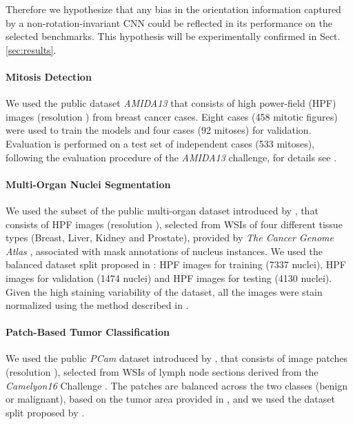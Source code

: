 \documentclass[twocolumn,final]{article}
\begin{document}
Therefore we hypothesize that any bias in the orientation information captured by a non-rotation-invariant CNN could be reflected in its performance on the selected benchmarks.
This hypothesis will be experimentally confirmed in Sect. \ref{sec:results}.

\paragraph{Mitosis Detection}
We used the public dataset \textit{AMIDA13} \citep{veta2015assessment} that consists of high power-field (HPF) images (resolution ) from  breast cancer cases.
Eight cases (458 mitotic figures) were used to train the models and four cases (92 mitoses) for validation.
Evaluation is performed on a test set of  independent cases (533 mitoses), following the evaluation procedure of the \textit{AMIDA13} challenge, for details see \citep{veta2015assessment}.

\paragraph{Multi-Organ Nuclei Segmentation}
We used the subset of the public multi-organ dataset introduced by \citep{kumar2017dataset}, that consists of  HPF images (resolution ), selected from WSIs of four different tissue types (Breast, Liver, Kidney and Prostate), provided by \textit{The Cancer Genome Atlas} \citep{tcga2012}, associated with mask annotations of nucleus instances.
We used the balanced dataset split proposed in \citep{lafarge2019domain}:  HPF images for training (7337 nuclei),  HPF images for validation (1474 nuclei) and  HPF images for testing (4130 nuclei).
Given the high staining variability of the dataset, all the images were stain normalized using the method described in \citep{macenko2009method}.

\paragraph{Patch-Based Tumor Classification}
We used the public \textit{PCam} dataset introduced by \citep{veeling2018rotation}, that consists of  image patches (resolution ), selected from WSIs of lymph node sections derived from the \textit{Camelyon16} Challenge \citep{bejnordi2017camelyon}.
The patches are balanced 
across the two classes (benign or malignant), based on the tumor area provided in \citep{bejnordi2017camelyon}, and we used the dataset split proposed by \citep{veeling2018rotation}.
\end{document}
